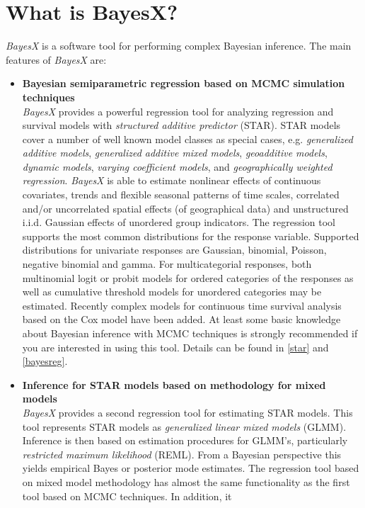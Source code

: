 \chapter{What is BayesX?}

{\em BayesX} is a software tool for performing complex Bayesian
inference. The main features of {\em BayesX} are:
\begin{itemize}
\item {\bf Bayesian semiparametric regression based on MCMC simulation techniques} \\
{\em BayesX} provides a powerful regression tool for analyzing
regression and survival models with {\em structured additive
predictor} (STAR). STAR models cover a number of well known model
classes as special cases, e.g. {\em generalized additive models},
{\em generalized additive mixed models}, {\em geoadditive models},
{\em dynamic models}, {\em varying coefficient models}, and {\em
geographically weighted regression}. {\em BayesX} is able to
estimate nonlinear effects of continuous covariates, trends and
flexible seasonal patterns of time scales, correlated and/or
uncorrelated spatial effects (of geographical data) and
unstructured i.i.d. Gaussian effects of unordered group
indicators. The regression tool  supports the most common
distributions for the response variable. Supported distributions
for univariate responses are Gaussian, binomial, Poisson, negative
binomial and gamma. For multicategorial responses, both
multinomial logit or probit models for ordered categories of the
responses as well as cumulative threshold models for unordered
categories may be estimated. Recently complex models for
continuous time survival analysis based on the Cox model have been
added. At least some basic knowledge about Bayesian inference with
MCMC techniques is strongly recommended if you are interested in
using this tool. Details can be found in \autoref{star} and
\autoref{bayesreg}.
\item {\bf Inference for STAR models based on methodology for mixed models} \\
{\em BayesX} provides a second regression tool for estimating STAR
models. This tool represents STAR models as {\em generalized
linear mixed models} (GLMM). Inference is then based on estimation
procedures for GLMM's, particularly {\em restricted maximum
likelihood} (REML). From a Bayesian perspective this yields
empirical Bayes or posterior mode estimates. The regression tool
based on mixed model methodology has almost the same functionality
as the first tool based on MCMC techniques. In addition, it

\end{itemize}
